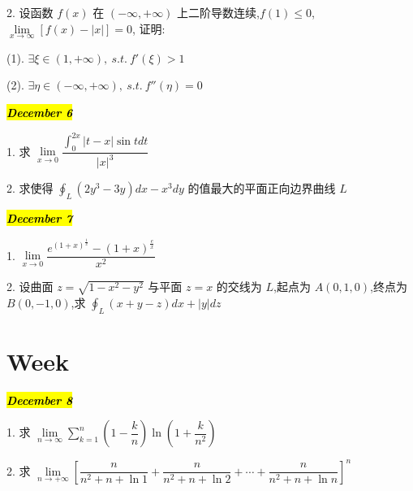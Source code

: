 2. 设函数 $f(x)$ 在 $(-\infty,+\infty)$ 上二阶导数连续,$f(1)\leq 0$,$\lim\limits_{x\rightarrow \infty}\left[ f(x)-|x|\right]=0$, 证明:

(1). $\exists \xi\in(1,+\infty),\ s.t.\ f'(\xi)>1$

(2). $\exists \eta\in(-\infty,+\infty),\ s.t.\ f''(\eta)=0$
\begin{solution}
	
\end{solution}

\hl{\textbf{\textit{December 6}}}

1. 求 $\displaystyle{\lim\limits_{x\rightarrow 0}\dfrac{\int_{0}^{2x}|t-x|\sin tdt}{|x|^{3}}}$
\begin{solution}
	
\end{solution}

2. 求使得 $\displaystyle{\oint_{L}(2y^{3}-3y)dx-x^{3}dy}$ 的值最大的平面正向边界曲线 $L$
\begin{solution}
	
\end{solution}

\hl{\textbf{\textit{December 7}}}

1. $\lim\limits_{x\rightarrow 0}\dfrac{e^{(1+x)^{\frac{1}{x}}}-(1+x)^{\frac{e}{x}}}{x^{2}}$
\begin{solution}
	
\end{solution}

2. 设曲面 $z=\sqrt{1-x^{2}-y^{2}}$ 与平面 $z=x$ 的交线为 $L$,起点为 $A(0,1,0)$,终点为 $B(0,-1,0)$,求 $\displaystyle{\oint_{L}(x+y-z)dx+|y|dz}$
\begin{solution}
	
\end{solution}

\section{Week }
\hl{\textbf{\textit{December 8}}}

1. 求 $\lim\limits_{n\rightarrow \infty}\sum\limits_{k=1}^{n}\left(1-\dfrac{k}{n}\right)\ln(1+\dfrac{k}{n^{2}})$
\begin{solution}
	
\end{solution}

2. 求 $\lim\limits_{n\rightarrow +\infty}\left[\dfrac{n}{n^{2}+n+\ln1}+\dfrac{n}{n^{2}+n+\ln2}+\cdots+\dfrac{n}{n^{2}+n+\ln n} \right]^{n}$
\begin{solution}
	
\end{solution}

